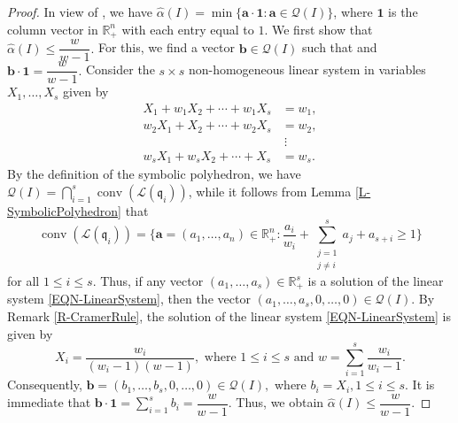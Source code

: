 \documentclass[12pt,reqno]{amsart}
\theoremstyle{definition}
\DeclareMathOperator{\conv}{conv}
\newcommand{\q}{\mathfrak{q}}
\newcommand{\RR}{\mathbb{R}}
\newcommand{\ba}{\mathbf{a}}
\newcommand{\bb}{\mathbf{b}}
\newcommand{\lattice}[1]{\mathcal L(#1)}
\newcommand{\ww}{\widehat{\alpha}}
\newcommand{\symbpoly}{\mathcal{Q}}
\numberwithin{equation}{section}
\begin{document}
\begin{proof}
   In view of \cite[Corollary 6.3]{CEHH}, we have $\ww(I) = \min \{\ba \cdot \mathbf{1} : \ba \in \symbpoly(I)\}$, where $\mathbf{1}$ is the column vector in $\RR_{+}^{n}$ with each entry equal to $1.$ We first show that $\ww(I) \le \dfrac{w}{w - 1}.$ For this, we find a vector $\bb \in \symbpoly(I)$ such that and $\bb \cdot \mathbf{1} = \dfrac{w}{w - 1}.$ Consider the $s \times s$ non-homogeneous linear system in variables $X_1, \ldots, X_s$ given by
    \begin{equation}\label{EQN-LinearSystem}
        \begin{aligned}
            X_1 + w_1 X_2 + \cdots + w_1 X_s & = w_1,\\
            w_2 X_1 + X_2 + \cdots + w_2 X_s & = w_2,\\
            &\ \vdots \\
            w_s X_1 + w_s X_2 + \cdots + X_s & = w_s.
        \end{aligned}
    \end{equation}
    By the definition of the symbolic polyhedron, we have $\symbpoly(I) = \bigcap_{i = 1}^{s} \conv(\lattice{\q_i})$, while it follows from Lemma \ref{L-SymbolicPolyhedron} that
    \[\conv(\lattice{\q_i}) = \Bigg\{ \ba = (a_1, \ldots, a_n) \in \RR_{+}^{n} : \dfrac{a_i}{w_i} + \sum_{\substack{j = 1 \\ j \ne i}}^{s} a_j + a_{s + i} \ge 1 \Bigg\}\]
    for all $1 \le i \le s.$ Thus, if any vector $(a_1, \ldots, a_s) \in \RR_{+}^{s}$ is a solution of the linear system \ref{EQN-LinearSystem}, then the vector $(a_1, \ldots, a_s, 0, \ldots, 0) \in \symbpoly(I).$ By Remark \ref{R-CramerRule}, the solution of the linear system \ref{EQN-LinearSystem} is given by
    \begin{equation}\label{EQN-Solution}
        X_i  = \dfrac{w_i}{(w_i - 1)(w - 1)},  \text{ where } 1 \le i \le s \text{ and } w = \sum_{i = 1}^{s}\dfrac{w_i}{w_i - 1}. 
    \end{equation}
    Consequently, $\bb = (b_1, \ldots, b_s, 0, \ldots, 0) \in \symbpoly(I),$ where $b_i=X_i, 1 \le i \le s.$ It is immediate that $\bb \cdot \mathbf{1} = \sum_{i = 1}^{s} b_i = \dfrac{w}{w - 1}.$ Thus, we obtain $\ww(I) \le \dfrac{w}{w-1}.$ 
    

\end{proof}
\end{document}
